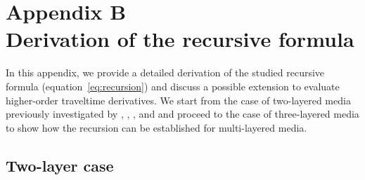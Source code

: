 \section{Appendix B \\ Derivation of the recursive formula}
\label{sec:appb}

In this appendix, we provide a detailed derivation of the studied recursive formula (equation~\ref{eq:recursion}) and discuss a possible extension to evaluate higher-order traveltime derivatives. We start from the case of two-layered media previously investigated by \cite{blias1981}, \cite{bliasgrit1984},  \cite{gritsenko}, and \cite{goldin} and proceed to the case of three-layered media to show how the recursion can be established for multi-layered media.

\subsection{Two-layer case}

